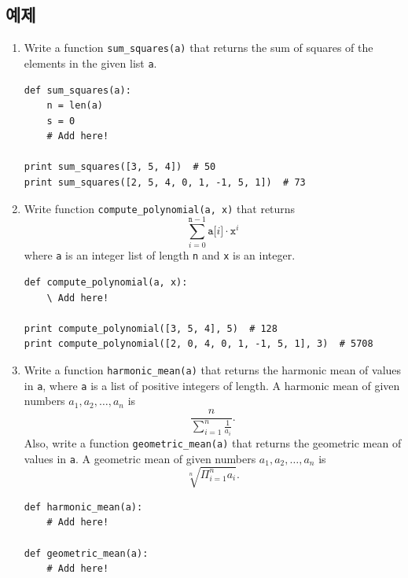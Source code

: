\documentclass[../main.tex]{subfiles}
\begin{document}
\subsection{예제}
\begin{enumerate}
\item Write a function \texttt{sum\_squares(a)} that returns the sum of squares of the elements in the given list \texttt{a}.
\begin{verbatim}
def sum_squares(a):
    n = len(a)
    s = 0
    # Add here!

print sum_squares([3, 5, 4])  # 50
print sum_squares([2, 5, 4, 0, 1, -1, 5, 1])  # 73
\end{verbatim}

\item Write function \texttt{compute\_polynomial(a, x)} that returns
\[
\sum_{i = 0}^{\texttt{n} - 1} \texttt{a[}i\texttt{]} \cdot \texttt{x}^i
\]
where \texttt{a} is an integer list of length \texttt{n} and \texttt{x} is an integer.
\begin{verbatim}
def compute_polynomial(a, x):
    \ Add here!

print compute_polynomial([3, 5, 4], 5)  # 128
print compute_polynomial([2, 0, 4, 0, 1, -1, 5, 1], 3)  # 5708
\end{verbatim}

\item Write a function \texttt{harmonic\_mean(a)} that returns the harmonic mean of values in \texttt{a}, where \texttt{a} is a list of positive integers of length.
A harmonic mean of given numbers $a_1, a_2, \dots, a_n$ is
\[
\frac{n}{\sum_{i = 1}^{n} \frac{1}{a_i}}.
\]
Also, write a function \texttt{geometric\_mean(a)} that returns the geometric mean of values in \texttt{a}.
A geometric mean of given numbers $a_1, a_2, \dots, a_n$ is
\[
\sqrt[n]{\Pi_{i = 1}^{n} a_i}.
\]

\begin{verbatim}
def harmonic_mean(a):
    # Add here!

def geometric_mean(a):
    # Add here!


\end{verbatim}
\end{enumerate}
\end{document}
